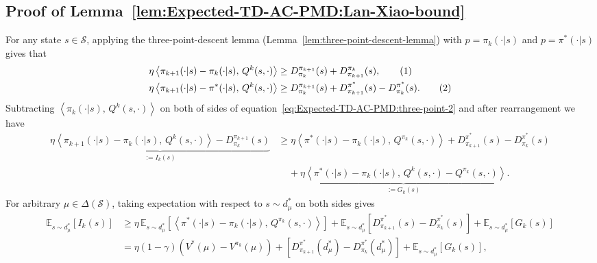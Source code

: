 \documentclass[10pt]{article}
\newcommand{\calS}{\mathcal{S}}
\newcommand{\E}{\mathbb{E}}
\newcommand{\ls}{\left}
\newcommand{\rs}{\right}
\newcommand\numberthis{\addtocounter{equation}{1}\tag{\theequation}}
\theoremstyle{plain}
\theoremstyle{definition}
\begin{document}
\subsection{Proof of Lemma~\ref{lem:Expected-TD-AC-PMD:Lan-Xiao-bound}}\label{sec:proof:Expected-TD-AC-PMD:Lan-Xiao-bound}
For any state $s\in\calS$, applying the three-point-descent lemma (Lemma~\ref{lem:three-point-descent-lemma}) with $p=\pi_{k }(\cdot|s)$ and $p=\pi^*(\cdot|s)$ gives that
    \begin{align*}
        \eta \ls\langle \pi_{k+1}(\cdot|s) - \pi_k(\cdot|s), \, Q^k(s,\cdot) \rs\rangle &\geq D^{\pi_{k+1}}_{\pi_k}(s) + D^{\pi_k}_{\pi_{k+1}}(s), \numberthis \label{eq:Expected-TD-AC-PMD:three-poinj-1} \\
        \eta \ls\langle \pi_{k+1}(\cdot|s) - \pi^*(\cdot|s) , \, Q^k(s,\cdot) \rs\rangle &\geq D^{\pi_{k+1}}_{\pi_k}(s) + D^{\pi^*}_{\pi_{k+1}}(s) - D^{\pi^*}_{\pi_k}(s). \numberthis \label{eq:Expected-TD-AC-PMD:three-point-2}
    \end{align*}
    Subtracting $\ls\langle \pi_k(\cdot|s), \, Q^k(s,\cdot) \rs\rangle$ on both of sides of equation~\eqref{eq:Expected-TD-AC-PMD:three-point-2} and after rearrangement we have 
    \begin{equation*}
    \begin{aligned}
        \underbrace{\eta \ls\langle \pi_{k+1}(\cdot|s) - \pi_k(\cdot|s), \, Q^k(s,\cdot) \rs\rangle - D^{\pi_{k+1}}_{\pi_k}(s)}_{:= I_k(s)} &\geq \eta \ls\langle \pi^*(\cdot|s) - \pi_k(\cdot|s), \, Q^{\pi_k}(s,\cdot) \rs\rangle + D^{\pi^*}_{\pi_{k+1}}(s) - D^{\pi^*}_{\pi_k}(s) \\
        &\;\;\;\;+ \underbrace{\eta \ls\langle \pi^*(\cdot|s) - \pi_k (\cdot|s), \, Q^k(s,\cdot) - Q^{\pi_k}(s,\cdot)\rs\rangle}_{:= G_k(s)}.
    \end{aligned}
    \end{equation*}
    For arbitrary $\mu\in\Delta(\calS)$, taking expectation with respect to $s\sim d^{*}_\mu$ on both sides gives
    \begin{align*}
        \E_{s\sim d^*_\mu} [I_k(s)] &\geq \eta \, \E_{s\sim d^*_\mu} \ls[ \ls\langle \pi^*(\cdot|s) - \pi_k(\cdot|s), \, Q^{\pi_k}(s,\cdot) \rs\rangle \rs] + \E_{s\sim d^*_\mu} \ls[ D^{\pi^*}_{\pi_{k+1}}(s) - D^{\pi^*}_{\pi_k}(s) \rs] + \E_{s\sim d^*_{\mu}} [G_k(s)] \\
        &= \eta(1-\gamma) (V^*(\mu) - V^{\pi_k}(\mu)) + \ls[D^{\pi^*}_{\pi_{k+1}}(d^*_\mu) - D^{\pi^*}_{\pi_k}(d^*_\mu) \rs] + \E_{s\sim d^*_{\mu}} [G_k(s)],
    \end{align*}
\end{document}
